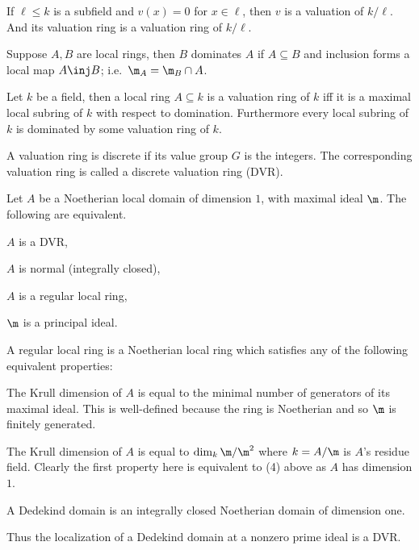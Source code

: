     If $\ell\leq k$ is a subfield and $v(x)=0$ for $x\in\ell$, then $v$ is a valuation of $k/\ell$.
    And its valuation ring is a valuation ring of $k/\ell$.

\edefn

\bdefn

    Suppose $A,B$ are local rings, then $B$ {\emphcolor dominates} $A$ if $A\subseteq B$ and inclusion forms
    a local map $A\inj B$; i.e.\ $\m_A=\m_B\cap A$.

\edefn

\bthrm

    Let $k$ be a field, then a local ring $A\subseteq k$ is a valuation ring of $k$ iff it is a maximal
    local subring of $k$ with respect to domination.
    Furthermore every local subring of $k$ is dominated by some valuation ring of $k$.

\ethrm

\bdefn

    A valuation ring is {\emphcolor discrete} if its value group $G$ is the integers.
    The corresponding valuation ring is called a {\emphcolor discrete valuation ring} ({\emphcolor DVR}).

\edefn

\bthrm

    Let $A$ be a Noetherian local domain of dimension $1$, with maximal ideal $\m$.
    The following are equivalent.
    \benum
        \item $A$ is a DVR,
        \item $A$ is normal (integrally closed),
        \item $A$ is a regular local ring,
        \item $\m$ is a principal ideal.
    \eenum

\ethrm

\bnote

    A regular local ring is a Noetherian local ring which satisfies any of the following equivalent properties:
    \benum
        \item The Krull dimension of $A$ is equal to the minimal number of generators of its maximal ideal.
        This is well-defined because the ring is Noetherian and so $\m$ is finitely generated.
        \item The Krull dimension of $A$ is equal to $\dim_k\m/\m^2$ where $k=A/\m$ is $A$'s residue field.
    \eenum
    Clearly the first property here is equivalent to (4) above as $A$ has dimension $1$.

\enote

\bdefn

    A {\emphcolor Dedekind domain} is an integrally closed Noetherian domain of dimension one.

\edefn

Thus the localization of a Dedekind domain at a nonzero prime ideal is a DVR.


